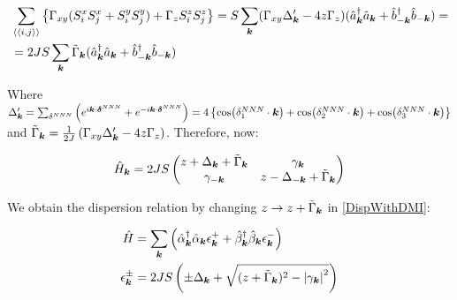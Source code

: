 \begin{align*}
&\sum_{\langle \langle i,j \rangle \rangle} \left\{ \Gamma_{xy}(S_i^xS_j^x + S_i^yS_j^y) + \Gamma_zS_i^zS_j^z\right\}
= S\sum_{\boldsymbol{k}} (\Gamma_{xy}\Delta'_{\boldsymbol{k}}-4z\Gamma_z) (\hat{a}^\dagger_{\boldsymbol{k}}\hat{a}_{\boldsymbol{k}}+\hat{b}^\dagger_{-\boldsymbol{k}}\hat{b}_{-\boldsymbol{k}}) = \\
&=2JS\sum_{\boldsymbol{k}} \tilde{\Gamma}_{\boldsymbol{k}}(\hat{a}^\dagger_{\boldsymbol{k}}\hat{a}_{\boldsymbol{k}}+\hat{b}^\dagger_{-\boldsymbol{k}}\hat{b}_{-\boldsymbol{k}})
\end{align*}

Where $\Delta'_{\boldsymbol{k}} = \sum_{\delta^{NNN}} \left( e^{i\boldsymbol{k}\cdot \boldsymbol{\delta}^{NNN}} +  e^{-i\boldsymbol{k}\cdot \boldsymbol{\delta}^{NNN}}\right) = 4\left\{ \cos(\delta^{NNN}_1\cdot\boldsymbol{k}) + \cos(\delta^{NNN}_2\cdot\boldsymbol{k}) + \cos(\delta^{NNN}_3\cdot\boldsymbol{k})\right\}$ and $\tilde{\Gamma}_{\boldsymbol{k}} = \frac{1}{2J}\left( \Gamma_{xy}\Delta'_{\boldsymbol{k}}-4z\Gamma_z \right)$. Therefore, now:

\begin{equation}
\hat{H}_{\boldsymbol{k}} = 2JS\begin{pmatrix} 
z + \Delta_{\boldsymbol{k}} + \tilde{\Gamma}_{\boldsymbol{k}} & \gamma_{\boldsymbol{k}} \\
\gamma_{-\boldsymbol{k}} & z - \Delta_{-\boldsymbol{k}} + \tilde{\Gamma}_{\boldsymbol{k}}
\end{pmatrix}
\end{equation}

We obtain the dispersion relation by changing $z \rightarrow z + \tilde{\Gamma}_{\boldsymbol{k}}$ in \ref{DispWithDMI}:

\begin{align}
\hat{H} &= \sum_{\boldsymbol{k}} \left( \hat{\alpha}_{\boldsymbol{k}}^\dagger \hat{\alpha}_{\boldsymbol{k}} \epsilon_{\boldsymbol{k}}^+ +\hat{\beta}_{\boldsymbol{k}}^\dagger \hat{\beta}_{\boldsymbol{k}}  \epsilon_{\boldsymbol{k}}^- \right) \label{DispWithDMI} \\
\epsilon_{\boldsymbol{k}}^\pm &= 2JS \left( \pm \Delta_{\boldsymbol{k}} +  \sqrt{(z + \tilde{\Gamma}_{\boldsymbol{k}})^2-\abs{\gamma_{\boldsymbol{k}}}^2} \right)
\end{align}

